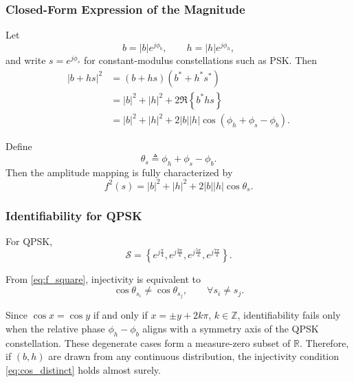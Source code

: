 \documentclass[journal]{IEEEtran}
\begin{document}
\subsubsection{Closed-Form Expression of the Magnitude}

Let
\begin{equation}
b = |b| e^{j\phi_b}, 
\qquad
h = |h| e^{j\phi_h},
\end{equation}
and write $s = e^{j\phi_s}$ for constant-modulus constellations such as PSK.
Then
\begin{align}
|b + h s|^2
&= (b + h s)(b^{*} + h^{*} s^{*}) \nonumber\\
&= |b|^2 + |h|^2 
 + 2 \Re\!\left\{ b^{*} h s \right\} \nonumber\\
&= |b|^2 + |h|^2 
 + 2 |b||h| \cos\!\left(\phi_h + \phi_s - \phi_b \right).
\label{eq:magnitude_expansion}
\end{align}

Define
\begin{equation}
\theta_s \triangleq \phi_h + \phi_s - \phi_b .
\end{equation}
Then the amplitude mapping is fully characterized by
\begin{equation}
f^2(s)
=
|b|^2 + |h|^2 + 2|b||h|\cos\theta_s .
\label{eq:f_square}
\end{equation}

\subsubsection{Identifiability for QPSK}

For QPSK,
\begin{equation}
\mathcal{S}
=
\left\{
e^{j\frac{\pi}{4}},
e^{j\frac{3\pi}{4}},
e^{j\frac{5\pi}{4}},
e^{j\frac{7\pi}{4}}
\right\}.
\end{equation}

From \eqref{eq:f_square}, injectivity is equivalent to
\begin{equation}
\cos\theta_{s_i} \neq \cos\theta_{s_j},
\qquad \forall s_i \neq s_j.
\label{eq:cos_distinct}
\end{equation}

Since $\cos x = \cos y$ if and only if $x = \pm y + 2k\pi$, $k\in\mathbb{Z}$, identifiability fails only when the relative phase $\phi_h-\phi_b$ aligns with a symmetry axis of the QPSK constellation.
These degenerate cases form a measure-zero subset of $\mathbb{R}$.
Therefore, if $(b,h)$ are drawn from any continuous distribution, the injectivity condition \eqref{eq:cos_distinct} holds almost surely.
\end{document}
